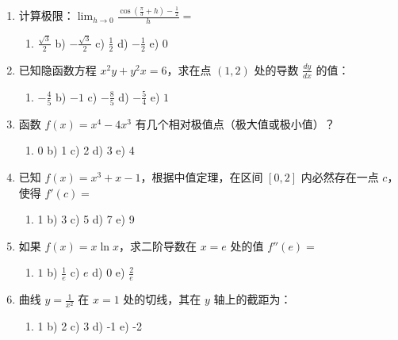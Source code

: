 \documentclass[12pt,a4paper]{article}
\begin{document}
\begin{enumerate}[label=\arabic*), itemsep=15pt]
    \item 计算极限：$\lim_{h \rightarrow 0} \frac{\cos(\frac{\pi}{3} + h) - \frac{1}{2}}{h} =$
    \begin{enumerate}[label=\alph*), itemsep=0pt]
        \item $\frac{\sqrt{3}}{2}$ \quad b) $-\frac{\sqrt{3}}{2}$ \quad c) $\frac{1}{2}$ \quad d) $-\frac{1}{2}$ \quad e) $0$
    \end{enumerate}

    \item 已知隐函数方程 $x^2 y + y^2 x = 6$，求在点 $(1, 2)$ 处的导数 $\frac{dy}{dx}$ 的值：
    \begin{enumerate}[label=\alph*), itemsep=0pt]
        \item $-\frac{4}{5}$ \quad b) $-1$ \quad c) $-\frac{8}{5}$ \quad d) $-\frac{5}{4}$ \quad e) $1$
    \end{enumerate}

    \item 函数 $f(x) = x^4 - 4x^3$ 有几个相对极值点（极大值或极小值）？
    \begin{enumerate}[label=\alph*), itemsep=0pt]
        \item 0 \quad b) 1 \quad c) 2 \quad d) 3 \quad e) 4
    \end{enumerate}

    \item 已知 $f(x) = x^3 + x - 1$，根据中值定理，在区间 $[0, 2]$ 内必然存在一点 $c$，使得 $f'(c) =$
    \begin{enumerate}[label=\alph*), itemsep=0pt]
        \item 1 \quad b) 3 \quad c) 5 \quad d) 7 \quad e) 9
    \end{enumerate}

    \item 如果 $f(x) = x \ln x$，求二阶导数在 $x=e$ 处的值 $f''(e) =$
    \begin{enumerate}[label=\alph*), itemsep=0pt]
        \item $1$ \quad b) $\frac{1}{e}$ \quad c) $e$ \quad d) $0$ \quad e) $\frac{2}{e}$
    \end{enumerate}

    \item 曲线 $y = \frac{1}{x^2}$ 在 $x = 1$ 处的切线，其在 $y$ 轴上的截距为：
    \begin{enumerate}[label=\alph*), itemsep=0pt]
        \item 1 \quad b) 2 \quad c) 3 \quad d) -1 \quad e) -2
    \end{enumerate}

\end{enumerate}
\end{document}
